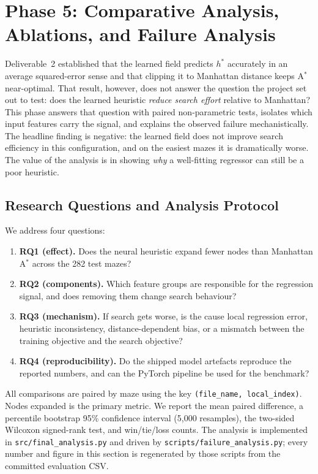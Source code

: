 ﻿%

\section{Phase 5: Comparative Analysis, Ablations, and Failure Analysis}

Deliverable~2 established that the learned field predicts $h^\ast$ accurately in an
average squared-error sense and that clipping it to Manhattan distance keeps A$^\ast$
near-optimal. That result, however, does not answer the question the project set out to
test: does the learned heuristic \emph{reduce search effort} relative to Manhattan? This
phase answers that question with paired non-parametric tests, isolates which input
features carry the signal, and explains the observed failure mechanistically. The
headline finding is negative: the learned field does not improve search efficiency in
this configuration, and on the easiest mazes it is dramatically worse. The value of the
analysis is in showing \emph{why} a well-fitting regressor can still be a poor heuristic.

\subsection{Research Questions and Analysis Protocol}

We address four questions:
\begin{enumerate}
  \item \textbf{RQ1 (effect).} Does the neural heuristic expand fewer nodes than
  Manhattan A$^\ast$ across the 282 test mazes?
  \item \textbf{RQ2 (components).} Which feature groups are responsible for the
  regression signal, and does removing them change search behaviour?
  \item \textbf{RQ3 (mechanism).} If search gets worse, is the cause local regression
  error, heuristic inconsistency, distance-dependent bias, or a mismatch between the
  training objective and the search objective?
  \item \textbf{RQ4 (reproducibility).} Do the shipped model artefacts reproduce the
  reported numbers, and can the PyTorch pipeline be used for the benchmark?
\end{enumerate}

All comparisons are paired by maze using the key \texttt{(file\_name, local\_index)}.
Nodes expanded is the primary metric. We report the mean paired difference, a percentile
bootstrap 95\% confidence interval (5{,}000 resamples), the two-sided Wilcoxon
signed-rank test, and win/tie/loss counts. The analysis is implemented in
\texttt{src/final\_analysis.py} and driven by \texttt{scripts/failure\_analysis.py};
every number and figure in this section is regenerated by those scripts from the
committed evaluation CSV.


